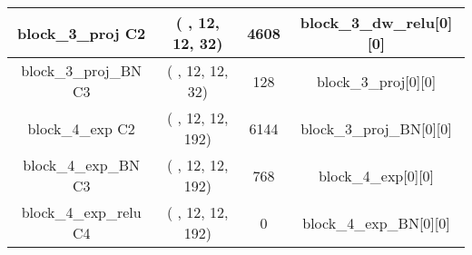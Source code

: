 \documentclass{bmvc2k}
\begin{document}
\begin{table}
\begin{tabular}{|c|c|c|c|}
block\_3\_proj C2        & ( , 12, 12, 32) &  4608   &     block\_3\_dw\_relu[0][0]     \\ \hline
block\_3\_proj\_BN C3 & ( , 12, 12, 32) &  128    &     block\_3\_proj[0][0]            \\ \hline
block\_4\_exp C2         & ( , 12, 12, 192)&  6144   &     block\_3\_proj\_BN[0][0]         \\ \hline
block\_4\_exp\_BN C3 & ( , 12, 12, 192)&  768    &     block\_4\_exp[0][0]             \\ \hline
block\_4\_exp\_relu C4      & ( , 12, 12, 192)&  0      &     block\_4\_exp\_BN[0][0]          \\ \hline

\end{tabular}
\end{table}
\end{document}
